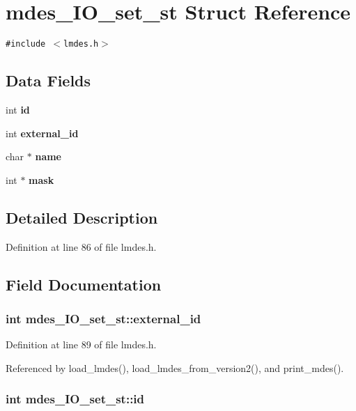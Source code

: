 \section{mdes\_\-IO\_\-set\_\-st Struct Reference}
\label{structmdes__IO__set__st}
{\tt \#include $<$lmdes.h$>$}

\subsection*{Data Fields}
\begin{CompactItemize}
\item 
int \bf{id}
\item 
int \bf{external\_\-id}
\item 
char $\ast$ \bf{name}
\item 
int $\ast$ \bf{mask}
\end{CompactItemize}


\subsection{Detailed Description}




Definition at line 86 of file lmdes.h.

\subsection{Field Documentation}
\subsubsection{\setlength{\rightskip}{0pt plus 5cm}int \bf{mdes\_\-IO\_\-set\_\-st::external\_\-id}}\label{structmdes__IO__set__st_fabb6d4d58c0daa390b1df63ac83c1d9}




Definition at line 89 of file lmdes.h.

Referenced by load\_\-lmdes(), load\_\-lmdes\_\-from\_\-version2(), and print\_\-mdes().
\subsubsection{\setlength{\rightskip}{0pt plus 5cm}int \bf{mdes\_\-IO\_\-set\_\-st::id}}\label{structmdes__IO__set__st_827dc14f483a6213a640701306467ae5}




